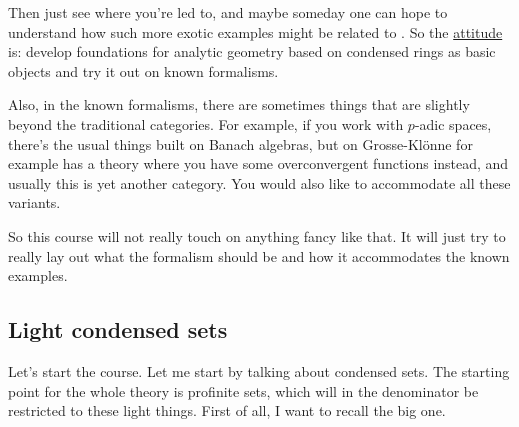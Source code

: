 Then just see where you're led to, and maybe someday one can hope to understand how such more exotic examples might be related to . So the \underline{attitude} is: develop foundations for analytic geometry based on condensed rings as basic objects and try it out on known formalisms.

Also, in the known formalisms, there are sometimes things that are slightly beyond the traditional categories. For example, if you work with $p$-adic spaces, there's the usual things built on Banach algebras, but on Grosse-Klönne  for example has a theory where you have some overconvergent functions instead, and usually this is yet another category. You would also like to accommodate all these variants.


So this course will not really touch on anything fancy like that. It will just try to really lay out what the formalism should be and how it accommodates the known examples.

\subsection{Light condensed sets} \label{subsec:light_condensed_sets}
Let's start the course. Let me start by talking about condensed sets. The starting point for the whole theory is profinite sets, which will in the denominator  be restricted to these light things. First of all, I want to recall the big one.


